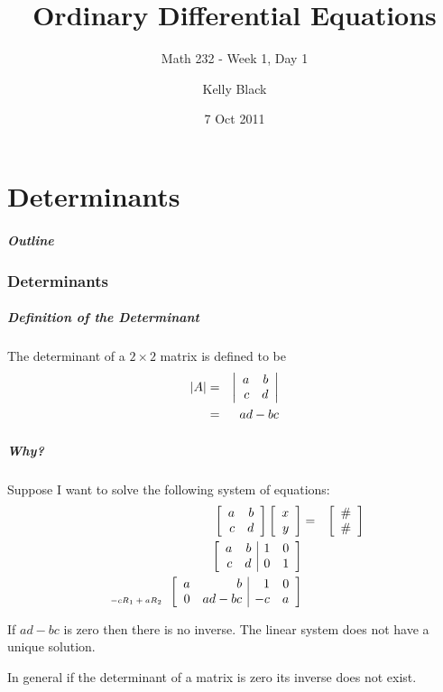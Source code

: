 \part{Determinants}




\title{Ordinary Differential Equations}
\subtitle{Math 232 - Week 1, Day 1}

\author{Kelly Black}
\date{7 Oct 2011}

\begin{frame}
  \titlepage
\end{frame}

\begin{frame}
  \frametitle{Outline}
\end{frame}


\section{Determinants}


\begin{frame}
  \frametitle{Definition of the Determinant}

  The determinant of a $2\times 2$ matrix is defined to be
  \begin{eqnarray*}
    |A| & = & \left| \begin{array}{rr} a & b \\ c & d \end{array} \right| \\
    & = & ad - bc
  \end{eqnarray*}

\end{frame}


\begin{frame}
  \frametitle{Why?}

  Suppose I want to solve the following system of equations:
  \begin{eqnarray*}
    \arrayTwo{a}{b}{c}{d} \vecTwo{x}{y} & = & \vecTwo{\#}{\#} \\
    \startRowOpsTwo
    \oneRowOpsTwo{a}{b}{1}{0}
    \oneRowOpsTwo{c}{d}{0}{1}
    \stopRowOps \\
    \stateTwo{}{-cR_1+aR_2}
    \startRowOpsTwo
    \oneRowOpsTwo{a}{b}{1}{0}
    \oneRowOpsTwo{0}{ad-bc}{-c}{a}
    \stopRowOps
  \end{eqnarray*}

  {
    If $ad-bc$ is zero then there is no inverse. The linear system
    does not have a unique solution.
  }

  {
    In general if the determinant of a matrix is zero its inverse does
    not exist. 
  }

\end{frame}


